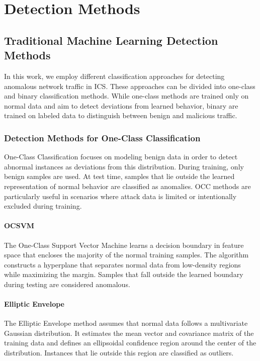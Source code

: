 \section{Detection Methods}
\subsection{Traditional Machine Learning Detection Methods}

In this work, we employ different classification approaches for detecting
anomalous network traffic in \ac{ICS}.
These approaches can be divided into one-class and binary 
classification methods. While one-class methods are trained only on
normal data and aim to detect deviations from learned behavior,
binary are trained on labeled data to
distinguish between benign and malicious traffic.

\subsubsection{Detection Methods for One-Class Classification}

One-Class Classification focuses on modeling benign data in order to detect abnormal instances as deviations
from this distribution. During training, only benign samples are used.
At test time, samples that lie outside the learned representation of
normal behavior are classified as anomalies. \ac{OCC} methods are particularly
useful in scenarios where attack data is limited or intentionally excluded
during training.

\paragraph{\ac{OCSVM}}

The One-Class Support Vector Machine learns a decision boundary in
feature space that encloses the majority of the normal training samples.
The algorithm constructs a hyperplane that separates normal data from
low-density regions while maximizing the margin. Samples that fall
outside the learned boundary during testing are considered anomalous.~\cite{aggarwal2017}

\paragraph{Elliptic Envelope}

The Elliptic Envelope method assumes that normal data follows a
multivariate Gaussian distribution. It estimates the mean vector
and covariance matrix of the training data and defines an ellipsoidal
confidence region around the center of the distribution. Instances
that lie outside this region are classified as outliers.~\cite{sklearnOutlier}

